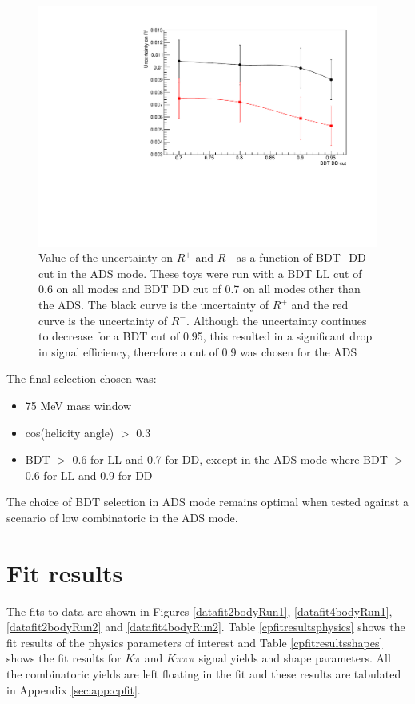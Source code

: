 \begin{figure}
\centering
\includegraphics[width=0.8\linewidth]{figures/selection/ADSoptimisation.pdf}
\caption{Value of the uncertainty on $R^+$ and $R^-$ as a function of BDT\_DD cut in the ADS mode. These toys were run with a BDT LL cut of 0.6 on all modes and BDT DD cut of 0.7 on all modes other than the ADS. The black curve is the uncertainty of $R^+$ and the red curve is the uncertainty of $R^-$. Although the uncertainty continues to decrease for a BDT cut of 0.95, this resulted in a significant drop in signal efficiency, therefore a cut of 0.9 was chosen for the ADS}
\label{adsoptimisation}
\end{figure}

The final selection chosen was:

\begin{itemize}
\item{75 MeV \Kstar mass window}
\item{\textbar cos(\KS helicity angle) \textbar $>$ 0.3}
\item{BDT $>$ 0.6 for LL and 0.7 for DD, except in the ADS mode where BDT $>$ 0.6 for LL and 0.9 for DD}
\end{itemize}

The choice of BDT selection in ADS mode remains optimal when tested against a scenario of low combinatoric in the ADS mode. 

\section{Fit results}
\label{sec:cpfit:results}

The fits to data are shown in Figures \ref{datafit2bodyRun1}, \ref{datafit4bodyRun1}, \ref{datafit2bodyRun2} and \ref{datafit4bodyRun2}. Table \ref{cpfitresultsphysics} shows the fit results of the physics parameters of interest and Table \ref{cpfitresultsshapes} shows the fit results for $K\pi$ and $K\pi\pi\pi$ signal yields and shape parameters. All the combinatoric yields are left floating in the fit and these results are tabulated in Appendix \ref{sec:app:cpfit}.

